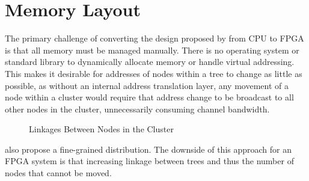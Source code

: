 \section{Memory Layout}

The primary challenge of converting the design proposed by \citeauthor{base} from CPU to FPGA is that all memory must be managed manually. There is no operating system or standard library to dynamically allocate memory or handle virtual addressing. This makes it desirable for addresses of nodes within a tree to change as little as possible, as without an internal address translation layer, any movement of a node within a cluster would require that address change to be broadcast to all other nodes in the cluster, unnecessarily consuming channel bandwidth.

\newcommand{\clusternode}[1]{
	\draw ({(#1)*6}, 0) ++(-2.75, 0.5) rectangle ++(5.5, -3);
	\node[tree] at ({(#1)*6}, 0) (n#1 00) {};
	\foreach \r [
		evaluate = \r as \w using int(3^\r),
		evaluate = \r as \wl using int(3^\r-1)
	] in {1,...,2} {
		\foreach \c [
			evaluate = \c as \i using int((\w-1)/2 + \c-1),
			evaluate = \c as \pr using int(\r-1),
			evaluate = \c as \pc using int(\c/3),
			evaluate = \c as \cl using int(\c-1)
		] in {0,...,\wl} {
			\node[tree] (n#1 \r\c)
				at ({(#1)*6 + (\c-int(\w/2)) / (\w/5)}, -\r) {};
			\draw[->] (n#1 \pr\pc) -- (n#1 \r\c);
			\ifthenelse{\c=0}{}{
				\draw[->] (n#1 \r\cl) -- (n#1 \r\c);
			}
		}
	}
}

\begin{figure}
\centering
{}
\caption{Linkages Between Nodes in the Cluster}
\end{figure}

\citeauthor{base} also propose a fine-grained distribution. The downside of this approach for an FPGA system is that increasing linkage between trees and thus the number of nodes that cannot be moved.
